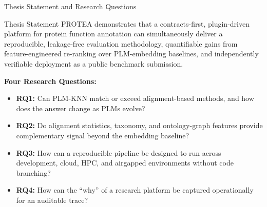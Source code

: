 \documentclass[12pt, aspectratio=169]{beamer}
\begin{document}
\begin{frame}{Thesis Statement and Research Questions}
  \begin{block}{Thesis Statement}
    PROTEA demonstrates that a contracts-first, plugin-driven platform for
    protein function annotation can simultaneously deliver a reproducible,
    leakage-free evaluation methodology, quantifiable gains from feature-engineered
    re-ranking over PLM-embedding baselines, and independently verifiable deployment
    as a public benchmark submission.
  \end{block}

  \vspace{0.8em}
  \textbf{Four Research Questions:}
  \begin{itemize}
    \item \textbf{RQ1:} Can PLM-KNN match or exceed alignment-based methods, and how does
               the answer change as PLMs evolve?
    \item \textbf{RQ2:} Do alignment statistics, taxonomy, and ontology-graph features
               provide complementary signal beyond the embedding baseline?
    \item \textbf{RQ3:} How can a reproducible pipeline be designed to run across
               development, cloud, HPC, and airgapped environments without code branching?
    \item \textbf{RQ4:} How can the ``why'' of a research platform be captured operationally
               for an auditable trace?
  \end{itemize}
\end{frame}

\end{document}
